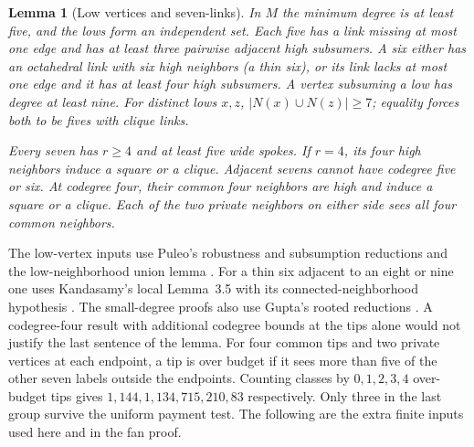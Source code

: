 \documentclass[11pt,a4paper]{amsart}
\newtheorem{lemma}[theorem]{Lemma}
\begin{document}
\begin{lemma}[Low vertices and seven-links]\label{lem:structure}
In $M$ the minimum degree is at least five, and the lows form an
independent set. Each five has a link missing at most one edge and
has at least three pairwise adjacent high subsumers. A six either has
an octahedral link with six high neighbors (a \emph{thin} six), or its
link lacks at most one edge and it has at least four high subsumers.
A vertex subsuming a low has degree at least nine. For distinct lows
$x,z$, $|N(x)\cup N(z)|\ge7$; equality forces both to be fives
with clique links.

Every seven has $r\ge4$ and at least five wide spokes. If $r=4$,
its four high neighbors induce a square or a clique. Adjacent
sevens cannot have codegree five or six. At codegree four, their
common four neighbors are high and induce a square or a clique.
Each of the two private neighbors on either side sees all four
common neighbors.
\end{lemma}

The low-vertex inputs use Puleo's robustness and subsumption
reductions \cite[\S2]{puleo} and the low-neighborhood union lemma
\cite[Lemma 3.3]{bfg}. For a thin six adjacent to an eight or nine
one uses Kandasamy's local Lemma~3.5 with its connected-neighborhood
hypothesis \cite{kandasamy}. The small-degree proofs also use
Gupta's rooted reductions \cite{gupta}. A codegree-four result with
additional codegree bounds at the tips alone would not justify the
last sentence of the lemma. For four common tips and two private
vertices at each endpoint, a tip is over budget if it sees more
than five of the other seven labels outside the endpoints.
Counting classes by $0,1,2,3,4$ over-budget tips gives
$1{,}144,1{,}134,715,210,83$ respectively. Only three in the
last group survive the uniform payment test. The following are
the extra finite
inputs used here and in the fan proof.
\end{document}

